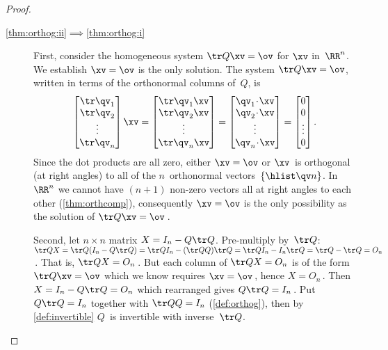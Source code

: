 \begin{proof}
\begin{description}
\item[\ref{thm:orthog:ii}$\implies$\ref{thm:orthog:i}] 
First, consider the homogeneous system \(\tr Q\xv=\ov\) for \(\xv\) in~\(\RR^n\).
We establish \(\xv=\ov\) is the only solution.
The system \(\tr Q\xv=\ov\), written in terms of the orthonormal columns of~\(Q\), is 
\begin{equation*}
\begin{bmatrix} \tr\qv_1\\\tr\qv_2\\\vdots\\\tr\qv_n \end{bmatrix}\xv
=\begin{bmatrix} \tr\qv_1\xv\\\tr\qv_2\xv\\\vdots\\\tr\qv_n\xv \end{bmatrix}
=\begin{bmatrix} \qv_1\cdot\xv\\\qv_2\cdot\xv\\\vdots\\\qv_n\cdot\xv \end{bmatrix}
=\begin{bmatrix} 0\\0\\\vdots\\0 \end{bmatrix}.
\end{equation*}
Since the dot products are all zero, either \(\xv=\ov\) or \(\xv\)~is orthogonal (at right angles) to all of the \(n\)~orthonormal vectors~\(\{\hlist\qv n\}\).
In~\(\RR^n\) we cannot have \((n+1)\) non-zero vectors all at right angles to each other (\autoref{thm:orthcomp}), consequently \(\xv=\ov\) is the only possibility as the solution of \(\tr Q\xv=\ov\)\,.

Second, let \(n\times n\) matrix \(X=I_n-Q\tr Q\).
Pre-multiply by~\(\tr Q\): \(\tr QX
=\tr Q(I_n-Q\tr Q)
=\tr QI_n-(\tr QQ)\tr Q
=\tr QI_n-I_n\tr Q
=\tr Q-\tr Q
=O_n\)\,.
That is, \(\tr QX=O_n\)\,. 
But each column of \(\tr QX=O_n\) is of the form \(\tr Q\xv=\ov\) which we know requires \(\xv=\ov\)\,, hence \(X=O_n\)\,.
Then \(X=I_n-Q\tr Q=O_n\) which rearranged gives \(Q\tr Q=I_n\)\,. 
Put \(Q\tr Q=I_n\) together with \(\tr QQ=I_n\) (\autoref{def:orthog}),  then by \autoref{def:invertible}  \(Q\)~is invertible with inverse~\(\tr Q\).


\end{description}
\end{proof}
